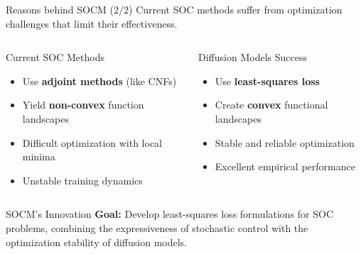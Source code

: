 \documentclass[aspectratio=169,xcolor=dvipsnames]{beamer}
\begin{document}
\begin{frame}{Reasons behind SOCM (2/2)}
    Current SOC methods suffer from optimization challenges that limit their effectiveness.
    
    \vspace{0.3cm}
    
    \begin{columns}[t]
        \begin{alertblock}{Current SOC Methods}
            \begin{itemize}
                \item Use \textbf{adjoint methods} (like CNFs)
                \item Yield \textbf{non-convex} function landscapes
                \item Difficult optimization with local minima
                \item Unstable training dynamics
            \end{itemize}
        \end{alertblock}
        
        \begin{block}{Diffusion Models Success}
            \begin{itemize}
                \item Use \textbf{least-squares loss}
                \item Create \textbf{convex} functional landscapes
                \item Stable and reliable optimization
                \item Excellent empirical performance
            \end{itemize}
        \end{block}
    \end{columns}
    
    \vspace{0.4cm}
    
    \begin{block}{SOCM's Innovation}
        \textbf{Goal:} Develop least-squares loss formulations for SOC problems, combining the expressiveness of stochastic control with the optimization stability of diffusion models.
    \end{block}
\end{frame}
\end{document}
